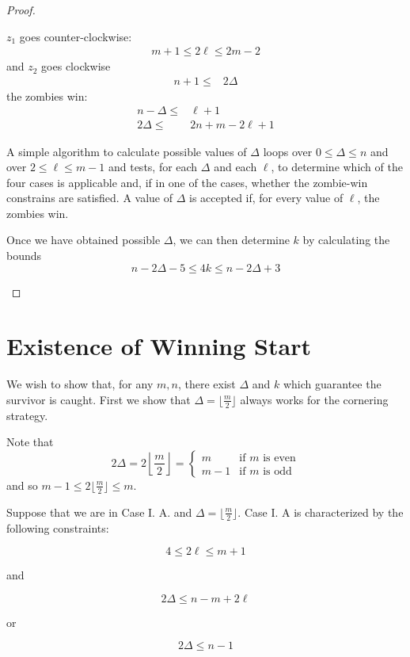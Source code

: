 \begin{proof}
\begin{proofpart}
  $z_1$ goes counter-clockwise:
  \begin{align*}
   m + 1 \leq 2 \ell \leq 2m - 2
  \end{align*}
  and $z_2$ goes clockwise
  \begin{align*}
   n+1 \leq & 2 \Delta
  \end{align*}
  the zombies win:
  \begin{align*}
   n - \Delta \leq & \ell + 1           \\
   2 \Delta \leq   & 2n + m - 2\ell + 1
  \end{align*}

A simple algorithm to calculate possible values of $\Delta$ loops
over $0 \leq \Delta \leq n$ and over $2 \leq \ell \leq m-1$ and tests,
for each $\Delta$ and each $\ell$, to determine which of the four cases is
applicable and, if in one of the cases, whether the zombie-win constrains are
satisfied. A value of $\Delta$ is accepted if, for every value of $\ell$, the
zombies win.

Once we have obtained possible $\Delta$, we can then determine $k$ by
calculating the bounds
\[ n - 2\Delta -5 \leq 4k \leq n-2\Delta +3 \]


 \end{proofpart}
\end{proof}

\newpage
\section{Existence of Winning Start}

We wish to show that, for any $m, n$, there exist $\Delta$ and $k$
which guarantee the survivor is caught.
First we show that $\Delta = \lfloor \frac{m}{2} \rfloor$ always
works for the cornering strategy.

Note that
\[
2\Delta = 2 \left\lfloor \frac{m}{2} \right\rfloor =
\begin{cases}
m & \text{if $m$ is even} \\
m -1 & \text{if $m$ is odd}
\end{cases}
\]
and so $m -1 \leq 2 \lfloor \frac{m}{2} \rfloor \leq m$.

Suppose that we are in Case I. A. and $\Delta = \lfloor \frac{m}{2} \rfloor$.
Case I. A is characterized by the following constraints:

\[ 4 \leq 2 \ell \leq m+1 \]
\begin{center}and\end{center}
\[ 2\Delta \leq n - m + 2\ell \]
\begin{center}or\end{center}
\[ 2\Delta \leq n-1 \]

